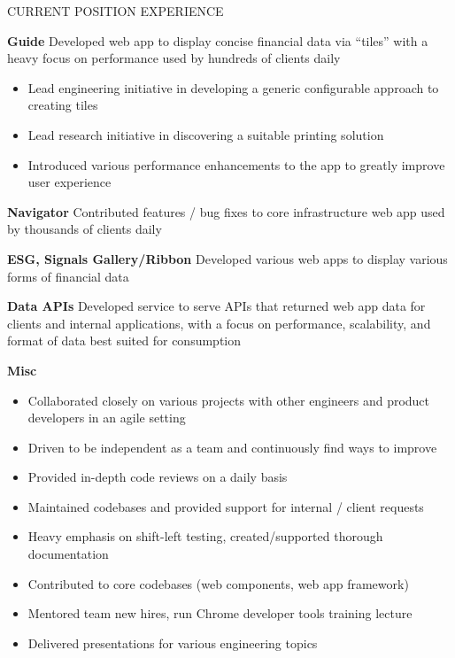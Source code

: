 \documentclass{edit} %
\begin{document}
\begin{rSection}{CURRENT POSITION EXPERIENCE}
\item \textbf{Guide} {Developed web app to display concise financial data via ``tiles'' with a heavy focus on performance used by hundreds of clients daily }
\begin{itemize}
    \itemsep -9pt {}
    \item Lead engineering initiative in developing a generic configurable approach to creating tiles
    \item Lead research initiative in discovering a suitable printing solution
    \item Introduced various performance enhancements to the app to greatly improve user experience
\end{itemize}
\item \textbf{Navigator} {Contributed features / bug fixes to core infrastructure web app used by thousands of clients daily}
\item \textbf{ESG, Signals Gallery/Ribbon} {Developed various web apps to display various forms of financial data}
\item \textbf{Data APIs} {Developed service to serve APIs that returned web app data for clients and internal applications, with a focus on performance, scalability, and format of data best suited for consumption}
\item \textbf{Misc}
\begin{itemize}
    \itemsep -9pt {}
    \item Collaborated closely on various projects with other engineers and product developers in an agile setting
    \item Driven to be independent as a team and continuously find ways to improve
    \item Provided in-depth code reviews on a daily basis
    \item Maintained codebases and provided support for internal / client requests
    \item Heavy emphasis on shift-left testing, created/supported thorough documentation
    \item Contributed to core codebases (web components, web app framework)
    \item Mentored team new hires, run Chrome developer tools training lecture
    \item Delivered presentations for various engineering topics
\end{itemize}
\end{rSection}
\end{document}
